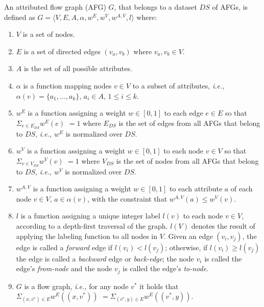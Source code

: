 \def\eg{{\it e.g., \/}}
\def\ie{{\it i.e., \/}}
\def\etal{{\it et al.\/}}
\def\viz{{\it viz.,\/ }}

An attributed flow graph (AFG) $G$, that belongs to a dataset $DS$ of AFGs, is defined as $G = \langle V, E, A, \alpha, w^E, w^V, w^{A,V}, l \rangle$ where:

\begin{enumerate}
\item $V$ is a set of nodes.

\item $E$ is a set of directed edges $(v_a, v_b)$ where $v_a, v_b \in V$.

\item $A$ is the set of all possible attributes.

\item $\alpha$ is a function mapping nodes $v \in V$ to a subset of attributes, \ie $\alpha(v) = \{a_1, ..., a_k\}$,  $a_i \in A$, $1 \leq i \leq k$.

\item $w^E$ is a function assigning a weight $w \in [0,1]$ to each edge $e \in E$ so that $\Sigma_{e \in E_{DS}}w^E(e)$ $ = 1$ where $E_{DS}$ is the set of edges from all AFGs that belong to $DS$, \ie $w^E$ is normalized over $DS$.  

\item $w^V$ is a function assigning a weight $w \in [0,1]$ to each node $v \in V$ so that $\Sigma_{v \in V_{DS}}w^V(v)$ $ = 1$ where $V_{DS}$ is the set of nodes from all AFGs that belong to $DS$, \ie $w^V$ is normalized over $DS$.

\item $w^{A,V}$ is a function assigning a weight $w \in [0,1]$ to each attribute $a$ of each node $v \in V$, $a \in \alpha(v)$, with the constraint that $w^{A,V}(a) \leq w^V(v)$.

\item $l$ is a function assigning a unique integer label $l(v)$ to each node $v \in V$, according to a depth-first traversal of the graph. $l(V)$ denotes the result of applying the labeling function to all nodes in $V$. Given an edge $(v_i, v_j)$, the edge is called a \emph{forward} edge if $l(v_i) < l(v_j)$; otherwise, if $l(v_i) \geq l(v_j)$ the edge is called a \emph{backward} edge or \emph{back-edge}; the node $v_i$ is called the edge's \emph{from-node} and the node $v_j$ is called the edge's \emph{to-node}.   

\item $G$ is a flow graph, \ie for any node $v^*$ it holds that
$\Sigma_{(x, v^*) \in E}w^E((x, v^*))$ $= \Sigma_{(v^*, y) \in E}w^E((v^*, y))$.

\end{enumerate}


